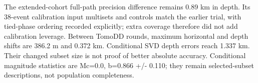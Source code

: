 The extended-cohort full-path precision difference remains 0.89 km in depth. Its 38-event calibration input multisets and controls match the earlier trial, with tied-phase ordering recorded explicitly; extra coverage therefore did not add calibration leverage. Between TomoDD rounds, maximum horizontal and depth shifts are 386.2 m and 0.372 km. Conditional SVD depth errors reach 1.337 km. Their changed subset size is not proof of better absolute accuracy. Conditional magnitude statistics are Mc=0.0, b=0.866 +/- 0.110; they remain selected-subset descriptions, not population completeness.
